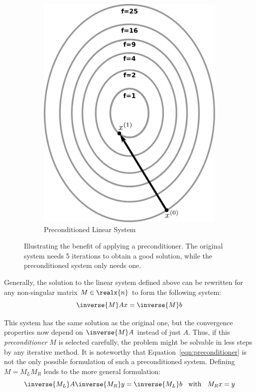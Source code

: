 \begin{figure}
\begin{subfigure}{.5\textwidth}
  \includegraphics[width=\linewidth]{figures/preconditioner.pdf}
  \caption{Preconditioned Linear System}
  \label{fig:preconditioner}
\end{subfigure}
\caption{Illustrating the benefit of applying a preconditioner. The original system needs 5 iterations to obtain a good solution, while the preconditioned system only needs one.}
\label{fig:preconditioning}
\end{figure}

Generally, the solution to the linear system defined above can be rewritten for any non-singular matrix $M \in \realx{n}$ to form the following system:
\begin{equation}
\label{eqn:preconditioner}
    \inverse
    {M}Ax = \inverse{M}b
\end{equation}

\noindent This system has the same solution as the original one, but the convergence properties now depend on $\inverse{M}A$ instead of just $A$. Thus, if this \textit{preconditioner} $M$ is selected carefully, the problem might be solvable in less steps by any iterative method. It is noteworthy that Equation~\hyperref[eqn:preconditioner]{\ref{eqn:preconditioner}} is not the only possible formulation of such a preconditioned system. Defining $M=M_LM_R$ leads to the more general formulation:
\begin{equation}
    \inverse{M_L}A\inverse{M_R}y = \inverse{M_L}b\;\; \text{ with }\;\; M_Rx=y
\end{equation}

